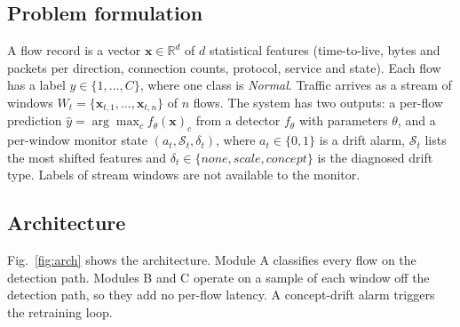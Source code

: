 \documentclass[pdflatex,sn-mathphys-num]{sn-jnl}%
\begin{document}
\subsection{Problem formulation}
A flow record is a vector $\mathbf{x}\in\mathbb{R}^{d}$ of $d$ statistical features (time-to-live, bytes and packets per direction, connection counts, protocol, service and state). Each flow has a label $y\in\{1,\dots,C\}$, where one class is \textit{Normal}. Traffic arrives as a stream of windows $W_t=\{\mathbf{x}_{t,1},\dots,\mathbf{x}_{t,n}\}$ of $n$ flows. The system has two outputs: a per-flow prediction $\hat{y}=\arg\max_c f_\theta(\mathbf{x})_c$ from a detector $f_\theta$ with parameters $\theta$, and a per-window monitor state $(a_t, \mathcal{S}_t, \delta_t)$, where $a_t\in\{0,1\}$ is a drift alarm, $\mathcal{S}_t$ lists the most shifted features and $\delta_t\in\{\textit{none},\textit{scale},\textit{concept}\}$ is the diagnosed drift type. Labels of stream windows are not available to the monitor.

\subsection{Architecture}
Fig.~\ref{fig:arch} shows the architecture. Module A classifies every flow on the detection path. Modules B and C operate on a sample of each window off the detection path, so they add no per-flow latency. A concept-drift alarm triggers the retraining loop.
\end{document}
